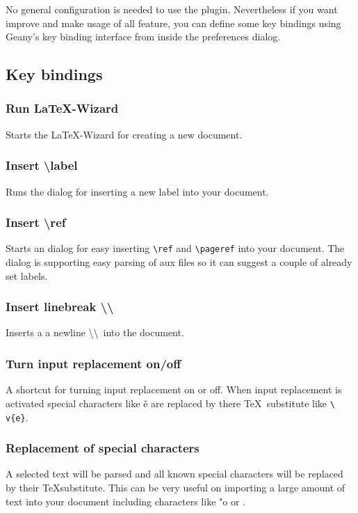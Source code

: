 \documentclass[%
a4paper,%
10pt,%
oneside,%
DIV18,
headsepline,
plainheadsepline,
footsepline,
plainfootsepline,
bibtotoc,%
liststotoc,%
BCOR12mm,%
halfparskip,%
openany,%
]{scrartcl}
\begin{document}
No general configuration is needed to use the plugin. Nevertheless if
you want improve and make usage of all feature, you can define some
key bindings using Geany's key binding interface from inside the
preferences dialog.

\subsection{Key bindings}

\subsubsection{Run LaTeX-Wizard}
\label{kb_latex_wizard}
Starts the LaTeX-Wizard for creating a new document.

\subsubsection{Insert \textbackslash label}
\label{kb_insert_label}
Runs the dialog for inserting a new label into your document.

\subsubsection{Insert \textbackslash ref}
\label{kb_insert_reference}
Starts an dialog for easy inserting \texttt{\textbackslash ref} and
\texttt{\textbackslash pageref} into your document. The dialog is
supporting easy parsing of aux files so it can suggest a couple of
already set labels.

\subsubsection{Insert linebreak \textbackslash \textbackslash}
Inserts a a newline \textbackslash\textbackslash\ into the document.

\subsubsection{Turn input replacement on/off}
\label{kb_toggling_input_replacement}
A shortcut for turning input replacement on or off. When input
replacement is activated special characters like \v{e} are
replaced by there \TeX\ substitute like \texttt{\textbackslash
v\{e\}}.

\subsubsection{Replacement of special characters}
\label{kb_replacement_of_special_char}
A selected text will be parsed and all known special characters will be
replaced by their \TeX substitute. This can be very useful on
importing a large amount of text into your document including
characters like "o or \frqq.
\end{document}
